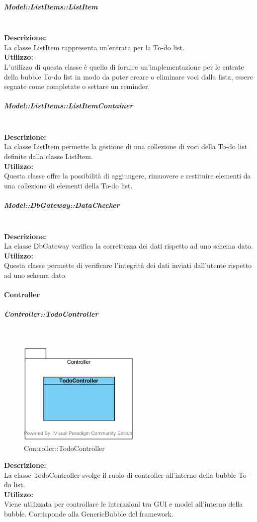\subparagraph{Model\-::List\-Items\-::List\-Item}\label{todo-item}\mbox{}\\
\textbf{Descrizione:}\\
La classe List\-Item rappresenta un'entrata per la To-do list.\\
\textbf{Utilizzo:}\\
L'utilizzo di questa classe è quello di fornire un'implementazione per le entrate della bubble To-do list in modo da poter creare o eliminare voci dalla lista, essere segnate come completate o settare un reminder.\\

\subparagraph{Model\-::List\-Items\-::List\-Item\-Container}\label{todo-container}\mbox{}\\
\textbf{Descrizione:}\\
La classe List\-Item permette la gestione di una collezione di voci della To-do list definite dalla classe List\-Item.\\
\textbf{Utilizzo:}\\
Questa classe offre la possibilità di aggiungere, rimuovere e restituire elementi da una collezione di elementi della To-do list.\\

\subparagraph{Model\-::Db\-Gateway\-::Data\-Checker}\label{todo-gateway}\mbox{}\\
\textbf{Descrizione:}\\
La classe Db\-Gateway verifica la correttezza dei dati rispetto ad uno schema dato.
\textbf{Utilizzo:}\\
Questa classe permette di verificare l'integrità dei dati inviati dall'utente rispetto ad uno schema dato.

\paragraph{Controller}\mbox{}
\begin{samepage}
	\subparagraph{Controller\-::Todo\-Controller}\mbox{}\\
	\nopagebreak
	\begin{figure}[H]
		\centering
		\includegraphics[height=5cm]{diagrammi_img/classi_e_package/todo_controller}
		\caption{Controller\-::Todo\-Controller}
	\end{figure}
\end{samepage}
\textbf{Descrizione:}\\
La classe TodoController svolge il ruolo di controller all'interno della bubble To-do list. \\
\textbf{Utilizzo:}\\
Viene utilizzata per controllare le interazioni tra GUI e model all'interno della bubble. Corrisponde alla GenericBubble del framework. \\